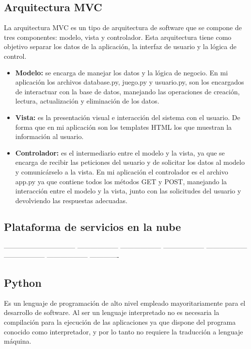 \subsection{Arquitectura MVC}
\cite{MVC} La arquitectura MVC es un tipo de arquitectura de software que se compone de tres componentes: modelo, vista y controlador. Esta arquitectura tiene como objetivo separar los datos de la aplicación, la interfaz de usuario y la lógica de control.
\begin{itemize}
    \item \textbf{Modelo:} se encarga de manejar los datos y la lógica de negocio. En mi aplicación los archivos database.py, juego.py y usuario.py, son los encargados de interactuar con la base de datos, manejando las operaciones de creación, lectura, actualización y eliminación de los datos.
    \item \textbf{Vista:} es la presentación visual e interacción del sistema con el usuario. De forma que en mi aplicación son los templates HTML los que muestran la información al usuario. 
    \item \textbf{Controlador:} es el intermediario entre el modelo y la vista, ya que se encarga de recibir las peticiones del usuario y de solicitar los datos al modelo y comunicárselo a la vista. En mi aplicación el controlador es el archivo app.py ya que contiene todos los métodos GET y POST, manejando la interacción entre el modelo y la vista, junto con las solicitudes del usuario y devolviendo las respuestas adecuadas.
\end{itemize}

\subsection{Plataforma de servicios en la nube}
--------------------------------
------------------
------------------
------------------
------------------
------------------
------------------
-------------

\subsection{Python}
\cite{Python1_bib} Es un lenguaje de programación de alto nivel empleado mayoritariamente para el desarrollo de software. \cite{Python2_bib} Al ser un lenguaje interpretado no es necesaria la compilación para la ejecución de las aplicaciones ya que dispone del programa conocido como interpretador, y por lo tanto no requiere la traducción a lenguaje máquina.

